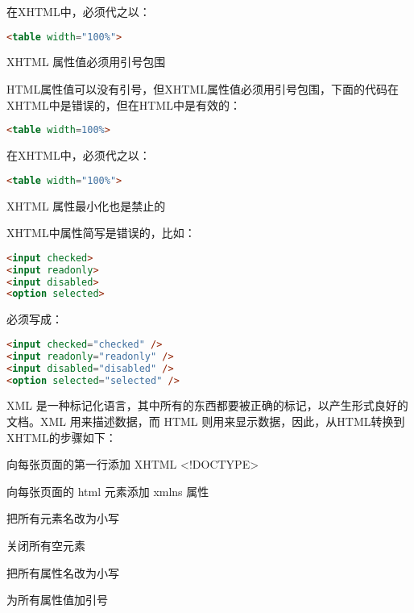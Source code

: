 \begin{compactitem}
\begin{compactitem}
在XHTML中，必须代之以：

\begin{lstlisting}[language=HTML]
<table width="100%">
\end{lstlisting}

	\item XHTML 属性值必须用引号包围

HTML属性值可以没有引号，但XHTML属性值必须用引号包围，下面的代码在XHTML中是错误的，但在HTML中是有效的：

\begin{lstlisting}[language=HTML]
<table width=100%>
\end{lstlisting}

在XHTML中，必须代之以：

\begin{lstlisting}[language=HTML]
<table width="100%">
\end{lstlisting}

	\item XHTML 属性最小化也是禁止的

XHTML中属性简写是错误的，比如：

\begin{lstlisting}[language=HTML]
<input checked>
<input readonly>
<input disabled>
<option selected>
\end{lstlisting}

必须写成：

\begin{lstlisting}[language=HTML]
<input checked="checked" />
<input readonly="readonly" />
<input disabled="disabled" />
<option selected="selected" />
\end{lstlisting}

	\end{compactitem}





\end{compactitem}

XML 是一种标记化语言，其中所有的东西都要被正确的标记，以产生形式良好的文档。XML 用来描述数据，而 HTML 则用来显示数据，因此，从HTML转换到XHTML的步骤如下：

\begin{compactenum}
\item 向每张页面的第一行添加 XHTML <!DOCTYPE>
\item 向每张页面的 html 元素添加 xmlns 属性
\item 把所有元素名改为小写
\item 关闭所有空元素
\item 把所有属性名改为小写
\item 为所有属性值加引号
\end{compactenum}

